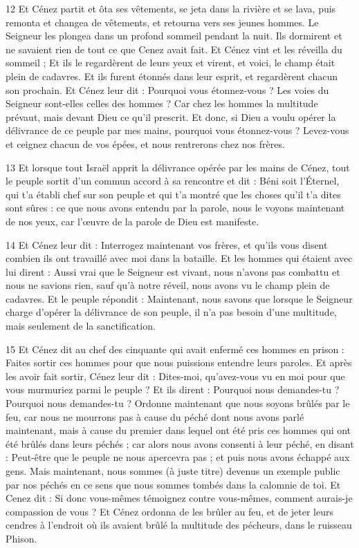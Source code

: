 \par 12 Et Cénez partit et ôta ses vêtements, se jeta dans la rivière et se lava, puis remonta et changea de vêtements, et retourna vers ses jeunes hommes. Le Seigneur les plongea dans un profond sommeil pendant la nuit. Ils dormirent et ne savaient rien de tout ce que Cenez avait fait. Et Cénez vint et les réveilla du sommeil ; Et ils le regardèrent de leurs yeux et virent, et voici, le champ était plein de cadavres. Et ils furent étonnés dans leur esprit, et regardèrent chacun son prochain. Et Cénez leur dit : Pourquoi vous étonnez-vous ? Les voies du Seigneur sont-elles celles des hommes ? Car chez les hommes la multitude prévaut, mais devant Dieu ce qu'il prescrit. Et donc, si Dieu a voulu opérer la délivrance de ce peuple par mes mains, pourquoi vous étonnez-vous ? Levez-vous et ceignez chacun de vos épées, et nous rentrerons chez nos frères.

\par 13 Et lorsque tout Israël apprit la délivrance opérée par les mains de Cénez, tout le peuple sortit d'un commun accord à sa rencontre et dit : Béni soit l'Éternel, qui t'a établi chef sur son peuple et qui t'a montré que les choses qu'il t'a dites sont sûres : ce que nous avons entendu par la parole, nous le voyons maintenant de nos yeux, car l'œuvre de la parole de Dieu est manifeste.

\par 14 Et Cénez leur dit : Interrogez maintenant vos frères, et qu'ils vous disent combien ils ont travaillé avec moi dans la bataille. Et les hommes qui étaient avec lui dirent : Aussi vrai que le Seigneur est vivant, nous n'avons pas combattu et nous ne savions rien, sauf qu'à notre réveil, nous avons vu le champ plein de cadavres. Et le peuple répondit : Maintenant, nous savons que lorsque le Seigneur charge d'opérer la délivrance de son peuple, il n'a pas besoin d'une multitude, mais seulement de la sanctification.

\par 15 Et Cénez dit au chef des cinquante qui avait enfermé ces hommes en prison : Faites sortir ces hommes pour que nous puissions entendre leurs paroles. Et après les avoir fait sortir, Cénez leur dit : Dites-moi, qu'avez-vous vu en moi pour que vous murmuriez parmi le peuple ? Et ils dirent : Pourquoi nous demandes-tu ? Pourquoi nous demandes-tu ? Ordonne maintenant que nous soyons brûlés par le feu, car nous ne mourrons pas à cause du péché dont nous avons parlé maintenant, mais à cause du premier dans lequel ont été pris ces hommes qui ont été brûlés dans leurs péchés ; car alors nous avons consenti à leur péché, en disant : Peut-être que le peuple ne nous apercevra pas ; et puis nous avons échappé aux gens. Mais maintenant, nous sommes (à juste titre) devenus un exemple public par nos péchés en ce sens que nous sommes tombés dans la calomnie de toi. Et Cenez dit : Si donc vous-mêmes témoignez contre vous-mêmes, comment aurais-je compassion de vous ? Et Cénez ordonna de les brûler au feu, et de jeter leurs cendres à l'endroit où ils avaient brûlé la multitude des pécheurs, dans le ruisseau Phison.

